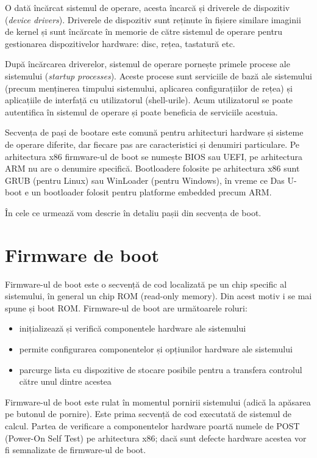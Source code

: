 O dată încărcat sistemul de operare, acesta încarcă și driverele de dispozitiv
(\textit{device drivers}). Driverele de dispozitiv sunt reținute în fișiere similare
imaginii de kernel și sunt încărcate în memorie de către sistemul de operare
pentru gestionarea dispozitivelor hardware: disc, rețea, tastatură etc.

După încărcarea driverelor, sistemul de operare pornește primele procese ale
sistemului (\textit{startup processes}). Aceste procese sunt serviciile de bază ale
sistemului (precum menținerea timpului sistemului, aplicarea configurațiilor de
rețea) și aplicațiile de interfață cu utilizatorul (shell-urile). Acum
utilizatorul se poate autentifica în sistemul de operare și poate beneficia de
serviciile acestuia.

Secvența de pași de bootare este comună pentru arhitecturi hardware și sisteme
de operare diferite, dar fiecare pas are caracteristici și denumiri particulare.
Pe arhitectura x86 firmware-ul de boot se numește BIOS sau UEFI, pe arhitectura
ARM nu are o denumire specifică. Bootloadere folosite pe arhitectura x86 sunt
GRUB (pentru Linux) sau WinLoader (pentru Windows), în vreme ce Das U-boot e un
bootloader folosit pentru platforme embedded precum ARM.

În cele ce urmează vom descrie în detaliu pașii din secvența de boot.

\section{Firmware de boot}
\label{sec:boot-firmware}

Firmware-ul de boot este o secvență de cod localizată pe un chip specific al
sistemului, în general un chip ROM (read-only memory). Din acest motiv i se mai
spune și boot ROM. Firmware-ul de boot are următoarele roluri:


\begin{itemize}
	\item inițializează și verifică componentele hardware ale sistemului
	\item permite configurarea componentelor și opțiunilor hardware ale
		sistemului
	\item parcurge lista cu dispozitive de stocare posibile pentru a
		transfera controlul către unul dintre acestea
\end{itemize}

Firmware-ul de boot este rulat în momentul pornirii sistemului (adică la
apăsarea pe butonul de pornire). Este prima secvență de cod executată de
sistemul de calcul. Partea de verificare a componentelor hardware poartă numele
de POST  (Power-On Self Test) pe arhitectura
x86; dacă sunt defecte hardware acestea vor fi semnalizate de firmware-ul de
boot.

